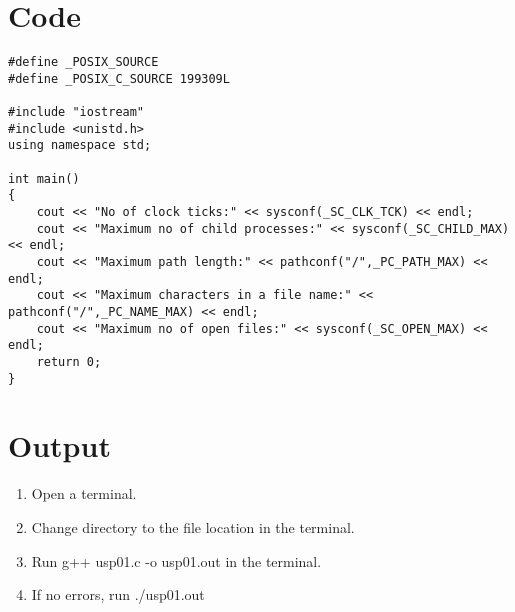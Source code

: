 \section{Code}

\begin{lstlisting}
#define _POSIX_SOURCE
#define _POSIX_C_SOURCE 199309L

#include "iostream"
#include <unistd.h>
using namespace std;

int main()
{
	cout << "No of clock ticks:" << sysconf(_SC_CLK_TCK) << endl;
	cout << "Maximum no of child processes:" << sysconf(_SC_CHILD_MAX) << endl;
	cout << "Maximum path length:" << pathconf("/",_PC_PATH_MAX) << endl;
	cout << "Maximum characters in a file name:" << pathconf("/",_PC_NAME_MAX) << endl;
	cout << "Maximum no of open files:" << sysconf(_SC_OPEN_MAX) << endl;
	return 0;
}
\end{lstlisting}

\section{Output}


\begin{enumerate}
	\item Open a terminal.
	\item Change directory to the file location in the terminal.
	\item Run g++ usp01.c -o usp01.out in the terminal.
	\item If no errors, run ./usp01.out
\end{enumerate}


